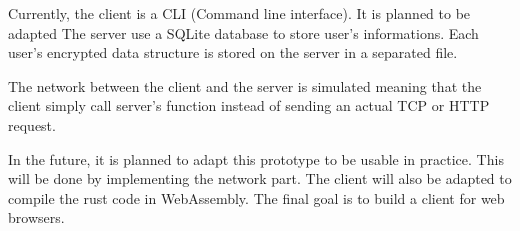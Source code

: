 \documentclass[../report.tex]{subfiles}
\begin{document}
Currently, the client is a CLI (Command line interface). It is planned to be adapted
The server use a SQLite database to store user's informations. Each user's encrypted data structure is stored on the server in a separated file. 

The network between the client and the server is simulated meaning that the client simply call server's function instead of sending an actual TCP or HTTP request.

In the future, it is planned to adapt this prototype to be usable in practice. This will be done by implementing the network part. The client will also be adapted to compile the rust code in WebAssembly. The final goal is to build a client for web browsers.
\end{document}
